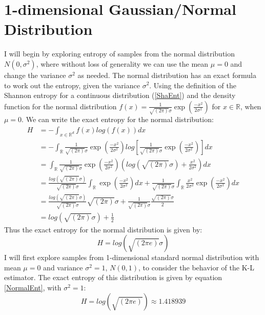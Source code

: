 \documentclass[12pt]{report}
\begin{document}
\section{1-dimensional Gaussian/Normal Distribution} \label{Normal_d=1}

I will begin by exploring entropy of samples from the normal distribution $N(0, \sigma^2)$, where without loss of generality we can use the mean $\mu = 0$ and change the variance $\sigma^2$ as needed. The normal distribution has an exact formula to work out the entropy, given the variance $\sigma^2$. Using the definition of the Shannon entropy for a continuous distribution (\ref{ShaEnt}) and the density function for the normal distribution $f(x) = \frac{1}{\sqrt{(2\pi)} \sigma}\exp{ \left( \frac{-x^2}{2\sigma^2} \right)}$ for $x \in \mathbb{R}$, when $\mu = 0$. We can write the exact entropy for the normal distribution:
\begin{align}
H &= - \int_{x \in \mathbb{R}^d} f(x) log(f(x)) dx \nonumber \\
&= - \int_{\mathbb{R}} \frac{1}{\sqrt{(2\pi)} \sigma}\exp{ \left( \frac{-x^2}{2\sigma^2} \right)} log \left[\frac{1}{\sqrt{(2\pi)} \sigma}\exp{ \left( \frac{-x^2}{2\sigma^2} \right)} \right] dx \nonumber \\
&=  \int_{\mathbb{R}} \frac{1}{\sqrt{(2\pi)} \sigma}\exp{ \left( \frac{-x^2}{2\sigma^2} \right)} \left( log(\sqrt{(2\pi)}\sigma) +  \frac{x^2}{2\sigma^2} \right) dx \nonumber \\
&= \frac{log(\sqrt{(2\pi)}\sigma)}{\sqrt{(2\pi)} \sigma} \int_{\mathbb{R}} \exp{ \left( \frac{-x^2}{2\sigma^2} \right)} dx +  \frac{1}{\sqrt{(2\pi)} \sigma} \int_{\mathbb{R}} \frac{x^2}{2\sigma^2}  \exp{ \left( \frac{-x^2}{2 \sigma^2} \right)} dx \nonumber \\
&= \frac{log(\sqrt{(2\pi)}\sigma)}{\sqrt{(2\pi)} \sigma} \sqrt{(2 \pi)} \sigma + \frac{1}{\sqrt{(2\pi)} \sigma} \frac{\sqrt{(2\pi)} \sigma}{2} \nonumber \\
&=  log(\sqrt{(2\pi)}\sigma) + \frac{1}{2} \nonumber 
\end{align}
Thus the exact entropy for the normal distribution is given by:
\begin{equation}\label{NormalEnt}
H =  log(\sqrt{(2\pi e)}\sigma) 
\end{equation}
I will first explore samples from 1-dimensional standard normal distribution with mean $\mu = 0$ and variance $\sigma^2 = 1$, $N(0, 1)$, to consider the behavior of the K-L estimator. The exact entropy of this distribution is given by equation \ref{NormalEnt}, with $\sigma^2=1$:
\begin{equation} \label{normal_exact}
H = log(\sqrt{(2\pi e)}) \approx 1.418939
\end{equation}
\end{document}
